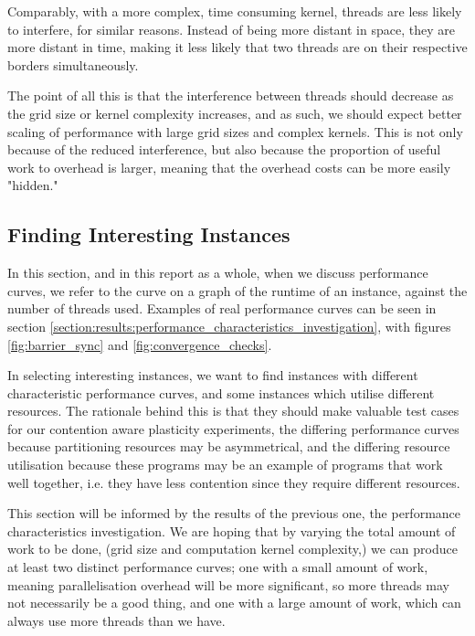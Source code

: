 Comparably, with a more complex, time consuming kernel, threads are less likely to interfere, for similar reasons. Instead of being more distant in space, they are more distant in time, making it less likely that two threads are on their respective borders simultaneously. 

The point of all this is that the interference between threads should decrease as the grid size or kernel complexity increases, and as such, we should expect better scaling of performance with large grid sizes and complex kernels. This is not only because of the reduced interference, but also because the proportion of useful work to overhead is larger, meaning that the overhead costs can be more easily "hidden."



\subsection{Finding Interesting Instances}
\label{section:design:interesting_instances}

In this section, and in this report as a whole, when we discuss performance curves, we refer to the curve on a graph of the runtime of an instance, against the number of threads used. Examples of real performance curves can be seen in section \ref{section:results:performance_characteristics_investigation}, with figures \ref{fig:barrier_sync} and \ref{fig:convergence_checks}.

In selecting interesting instances, we want to find instances with different characteristic performance curves, and some instances which utilise different resources. The rationale behind this is that they should make valuable test cases for our contention aware plasticity experiments, the differing performance curves because partitioning resources may be asymmetrical, and the differing resource utilisation because these programs may be an example of programs that work well together, i.e. they have less contention since they require different resources.

This section will be informed by the results of the previous one, the performance characteristics investigation. We are hoping that by varying the total amount of work to be done, (grid size and computation kernel complexity,) we can produce at least two distinct performance curves; one with a small amount of work, meaning parallelisation overhead will be more significant, so more threads may not necessarily be a good thing, and one with a large amount of work, which can always use more threads than we have.

